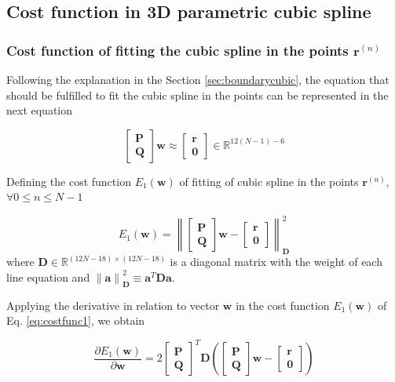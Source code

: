 \subsection{Cost function in 3D parametric cubic spline}

\subsubsection{Cost function of fitting the cubic spline in the points $\mathbf{r}^{(n)}$}

Following the explanation in the Section \ref{sec:boundarycubic},
the equation that should be fulfilled to fit the cubic spline in the points can be represented in the next equation

\begin{equation}
\begin{bmatrix}
\mathbf{P}\\
\mathbf{Q}
\end{bmatrix}
\mathbf{w}
\approx
\begin{bmatrix}
\mathbf{r}\\
\mathbf{0}
\end{bmatrix}
\in \mathbb{R}^{12(N-1)-6}
\end{equation}

Defining the cost function $E_{1}(\mathbf{w})$ of fitting of cubic spline in the points $\mathbf{r}^{(n)}$,
$\forall 0\leq n\leq N-1$

\begin{equation}\label{eq:costfunc1}
E_{1}(\mathbf{w})
=
\left\|
\begin{bmatrix}
\mathbf{P}\\
\mathbf{Q}
\end{bmatrix}
\mathbf{w}
-
\begin{bmatrix}
\mathbf{r}\\
\mathbf{0}
\end{bmatrix}
\right\|_{\mathbf{D}}^{2}
\end{equation}
where $\mathbf{D}\in \mathbb{R}^{(12N-18)\times(12N-18)}$ is a diagonal matrix with the weight of each line equation
and $\left\|\mathbf{a}\right\|_{\mathbf{D}}^{2}\equiv \mathbf{a}^{T}\mathbf{D}\mathbf{a}$.


Applying the derivative in relation to vector $\mathbf{w}$
\cite[pp. 11]{petersen2008matrix}
in the cost function $E_{1}(\mathbf{w})$ of Eq. \ref{eq:costfunc1}, 
we obtain

\begin{equation}\label{eq:DE1}
\frac{\partial E_{1}(\mathbf{w})}{\partial \mathbf{w}}
=
2
\begin{bmatrix}
\mathbf{P}\\
\mathbf{Q}
\end{bmatrix}^{T}
\mathbf{D}
\left(
\begin{bmatrix}
\mathbf{P}\\
\mathbf{Q}
\end{bmatrix}
\mathbf{w}
-
\begin{bmatrix}
\mathbf{r}\\
\mathbf{0}
\end{bmatrix}
\right)
\end{equation}

